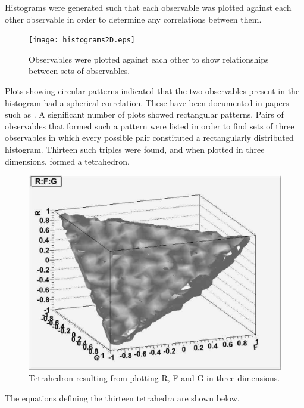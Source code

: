 \documentclass[a4paper,12pt]{article}
\begin{document}
Histograms were generated such that each observable was plotted against each other observable in order to determine any correlations between them.  

\begin{figure}[!h]
 \begin{center}
  \texttt{[image: histograms2D.eps]}
  \caption{Observables were plotted against each other to show relationships between sets of observables.}
 \end{center}
\end{figure}

Plots showing circular patterns indicated that the two observables present in the histogram had a spherical correlation.  These have been documented in papers such as \cite{info}. A significant number of plots showed rectangular patterns.  Pairs of observables that formed such a pattern were listed in order to find sets of three observables in which every possible pair constituted a rectangularly distributed histogram.  Thirteen such triples were found, and when plotted in three dimensions, formed a tetrahedron.

\begin{figure}[!h]
 \begin{center}
  \includegraphics[scale=0.3]{RFG.eps}
  \caption{Tetrahedron resulting from plotting R, F and G in three dimensions.}
 \end{center}
\end{figure}

The equations defining the thirteen tetrahedra are shown below.
\end{document}
